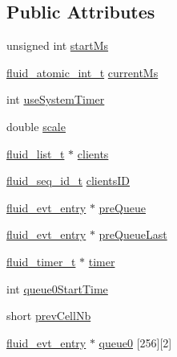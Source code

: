 \subsection*{Public Attributes}
\begin{DoxyCompactItemize}
\item 
unsigned int \hyperlink{struct__fluid__sequencer__t_a365e64793ab958e5ec12d4d3e123bd89}{start\+Ms}
\item 
\hyperlink{fluidsynth__priv_8h_a6b8be882dd9958ea3635a868e1bf5152}{fluid\+\_\+atomic\+\_\+int\+\_\+t} \hyperlink{struct__fluid__sequencer__t_a508b9a601401b6ee2d6e4659ed91ecde}{current\+Ms}
\item 
int \hyperlink{struct__fluid__sequencer__t_a6b42a433d5c2c3909570e006f937f208}{use\+System\+Timer}
\item 
double \hyperlink{struct__fluid__sequencer__t_a7c557f84e87e4a3429de3f84b7c0eb5f}{scale}
\item 
\hyperlink{fluid__list_8h_a3ef7535d4290862c0af118569223bd89}{fluid\+\_\+list\+\_\+t} $\ast$ \hyperlink{struct__fluid__sequencer__t_a644f30ae8cc5e9b9871f52c3d31e22c1}{clients}
\item 
\hyperlink{types_8h_a69f729a00307f2b8ec1be0dba2203c12}{fluid\+\_\+seq\+\_\+id\+\_\+t} \hyperlink{struct__fluid__sequencer__t_a851d4c371c4a777351f1fca1b263fc0d}{clients\+ID}
\item 
\hyperlink{fluid__event__priv_8h_ae1b4d1ef2ce32890f8cb36837628a9d8}{fluid\+\_\+evt\+\_\+entry} $\ast$ \hyperlink{struct__fluid__sequencer__t_ae0f443ced2ff9f9bfcafaee34a1f0055}{pre\+Queue}
\item 
\hyperlink{fluid__event__priv_8h_ae1b4d1ef2ce32890f8cb36837628a9d8}{fluid\+\_\+evt\+\_\+entry} $\ast$ \hyperlink{struct__fluid__sequencer__t_ab8196554368b2131823ec99f2d319e1e}{pre\+Queue\+Last}
\item 
\hyperlink{fluid__sys_8h_a520742276ee4ea4bf140e6e6be79e4ae}{fluid\+\_\+timer\+\_\+t} $\ast$ \hyperlink{struct__fluid__sequencer__t_ac2a815201eb399d26d2b347e9befa112}{timer}
\item 
int \hyperlink{struct__fluid__sequencer__t_aeeaffdfb156ba1a61e0263a6b6e60c41}{queue0\+Start\+Time}
\item 
short \hyperlink{struct__fluid__sequencer__t_afddad2afafb8e38ca13f296a537ea7f6}{prev\+Cell\+Nb}
\item 
\hyperlink{fluid__event__priv_8h_ae1b4d1ef2ce32890f8cb36837628a9d8}{fluid\+\_\+evt\+\_\+entry} $\ast$ \hyperlink{struct__fluid__sequencer__t_a629f92dc6f8a247e1e7ebecd911e2139}{queue0} \mbox{[}256\mbox{]}\mbox{[}2\mbox{]}

\end{DoxyCompactItemize}
